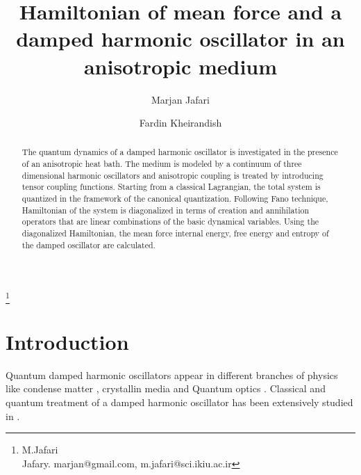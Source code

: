 \documentclass[preprint,showpacs,showkeys,groupedaddress,superscriptaddress]{revtex4}
\begin{document}
\title{Hamiltonian of mean force and a damped harmonic oscillator in an anisotropic medium }

\author{Marjan Jafari}
\footnote{M.Jafari\\Jafary. marjan@gmail.com, m.jafari@sci.ikiu.ac.ir}
\address{Department of Physics, Faculty of Science, Imam Khomeini International University, P.O.Box 34148 - 96818, Ghazvin, Iran}
\author{Fardin Kheirandish}
\address{Department of Physics, University of Kurdistan, P.O.Box 66177-15175, Sanandaj, Iran}

\begin{abstract}
The quantum dynamics of a damped harmonic oscillator is investigated in the presence of an anisotropic heat bath. The medium is modeled by a continuum of three dimensional harmonic oscillators and anisotropic coupling is treated by introducing tensor coupling functions. Starting from a classical Lagrangian, the total system is quantized in the framework of the canonical quantization. Following Fano technique, Hamiltonian of the system is diagonalized in terms of creation and annihilation operators that are linear combinations of the basic dynamical variables. Using the diagonalized Hamiltonian, the mean force internal energy, free energy and entropy of the damped oscillator are calculated.
\end{abstract}


\maketitle
\section{Introduction}\label{Introduction}
\noindent
Quantum damped harmonic oscillators appear in different branches of physics like condense matter \cite{10-6,12-6}, crystallin media \cite{8} and Quantum optics \cite{13-6,14-6}. Classical and quantum treatment of a damped harmonic oscillator has been extensively studied in \cite{1-2,2-2}.
\end{document}
